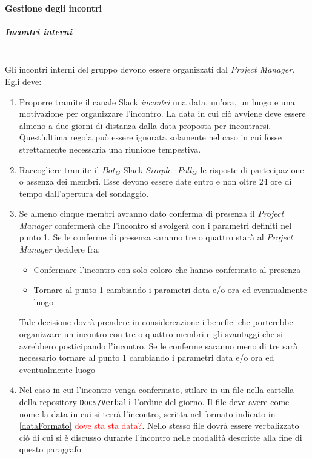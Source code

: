 		\paragraph{Gestione degli incontri}
			\subparagraph{Incontri interni} \mbox{} \\
			 Gli incontri interni del gruppo devono essere organizzati dal \emph{Project Manager}. Egli deve:
			\begin{enumerate}
				\item Proporre tramite il canale Slack \emph{incontri} una data, un'ora, un luogo e una motivazione per organizzare l'incontro. La data in cui ciò avviene deve essere almeno a due giorni di distanza dalla data proposta per incontrarsi. Quest'ultima regola può essere ignorata solamente nel caso in cui fosse strettamente necessaria una riunione tempestiva.
				
				\item Raccogliere tramite il $Bot_G$ Slack $Simple\textbf{ }Poll_G$ le risposte di partecipazione o assenza dei membri. Esse devono essere date entro e non oltre 24 ore di tempo dall'apertura del sondaggio.
				
				\item Se almeno cinque membri avranno dato conferma di presenza il \emph{Project Manager} confermerà che l'incontro si svolgerà con i parametri definiti nel punto 1. 
				Se le conferme di presenza saranno tre o quattro starà al \emph{Project Manager} decidere fra: 
				\begin{itemize}
					\item Confermare l'incontro con solo coloro che hanno confermato al presenza
					\item Tornare al punto 1 cambiando i parametri data e/o ora ed eventualmente luogo
				\end{itemize}
				Tale decisione dovrà prendere in considereazione i benefici che porterebbe organizzare un incontro con tre o quattro membri e gli svantaggi che si avrebbero posticipando l'incontro.
				Se le conferme saranno meno di tre sarà necessario tornare al punto 1 cambiando i parametri data e/o ora ed eventualmente luogo
				
				\item Nel caso in cui l'incontro venga confermato, stilare in un file nella cartella della repository \texttt{Docs/Verbali} l'ordine del giorno. Il file deve avere come nome la data in cui si terrà l'incontro, scritta nel formato indicato in \ref{dataFormato} \textcolor{red}{dove sta sta data?}. Nello stesso file dovrà essere verbalizzato ciò di cui si è discusso durante l'incontro nelle modalità descritte alla fine di questo paragrafo
			\end{enumerate}
